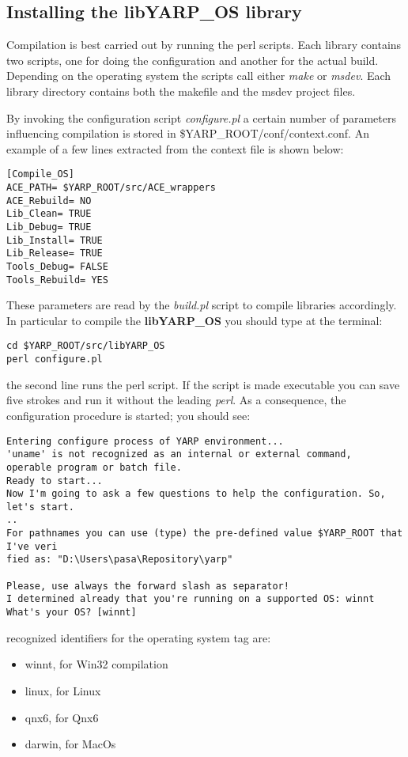 \subsection{Installing the libYARP\_OS library}
Compilation is best carried out by running the perl scripts. Each library contains two scripts, one for doing the configuration and another for the actual build. Depending on the operating system the scripts call either {\em make} or {\em msdev}. Each library directory contains both the makefile and the msdev project files.

By invoking the configuration script {\em configure.pl} a certain number of parameters influencing compilation is stored in \$YARP\_ROOT/conf/context.conf. An example of a few lines extracted from the context file is shown below:

\begin{verbatim}
[Compile_OS]
ACE_PATH= $YARP_ROOT/src/ACE_wrappers
ACE_Rebuild= NO
Lib_Clean= TRUE
Lib_Debug= TRUE
Lib_Install= TRUE
Lib_Release= TRUE
Tools_Debug= FALSE
Tools_Rebuild= YES
\end{verbatim}

These parameters are read by the {\em build.pl} script to compile libraries accordingly. In particular to compile the {\bf libYARP\_OS} you should type at the terminal:

\begin{verbatim}
cd $YARP_ROOT/src/libYARP_OS
perl configure.pl
\end{verbatim}

\noindent the second line runs the perl script. If the script is made executable you can save five strokes and run it without the leading {\em perl}. As a consequence, the configuration procedure is started; you should see:

\begin{verbatim}
Entering configure process of YARP environment...
'uname' is not recognized as an internal or external command,
operable program or batch file.
Ready to start...
Now I'm going to ask a few questions to help the configuration. So, let's start.
..
For pathnames you can use (type) the pre-defined value $YARP_ROOT that I've veri
fied as: "D:\Users\pasa\Repository\yarp"

Please, use always the forward slash as separator!
I determined already that you're running on a supported OS: winnt
What's your OS? [winnt]
\end{verbatim}

\noindent recognized identifiers for the operating system tag are:
\begin{itemize}
\item winnt, for Win32 compilation
\item linux, for Linux
\item qnx6, for Qnx6
\item darwin, for MacOs
\end{itemize}


